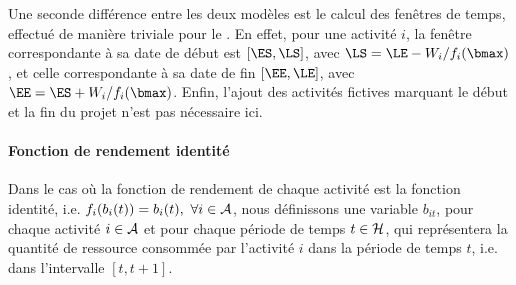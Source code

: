 Une seconde différence entre les deux modèles est le calcul des 
fenêtres de temps, effectué de manière triviale pour le \CECSP. 
En effet, pour une activité $i$,
la fenêtre correspondante à sa date de début est $[\ES,\LS]$, avec
$\LS=\LE-W_i/f_i(\bmax)$, et celle correspondante à sa date de fin
$[\EE,\LE]$, avec $\EE=\ES+W_i/f_i(\bmax)$. Enfin, l'ajout des
activités fictives marquant le début et la fin du projet n'est 
pas nécessaire ici.

\paragraph{Fonction de rendement identité}

Dans le cas où la fonction de rendement de chaque activité est la
fonction identité, i.e. $f_i(b_i(t))=b_i(t),\ \forall i \in \A$, nous
définissons une variable $b_{it}$, pour chaque activité $i \in {\cal A}$ et
pour chaque période de temps $t \in {\cal H}$, qui représentera la quantité
de ressource consommée par l'activité $i$ dans la période de temps
$t$, i.e. dans l'intervalle $[t,t+1]$.

